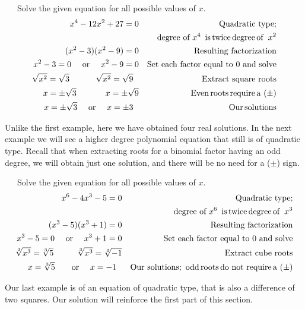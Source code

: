 \begin{example}~~~Solve the given equation for all possible values of $x$.
  \begin{eqnarray*}
   x^4-12x^2+27 = 0 &  & \operatorname{Quadratic~type;}\\
	& & ~~~\text{degree~of~} x^4 \operatorname{~is} \operatorname{twice} \operatorname{degree} \operatorname{of~} x^2\\
   (x^2-3)(x^2-9)=0 &  & \text{Resulting~factorization}  \\
	 x^2-3=0 \text{~~~~or~~~~} x^2-9=0 &  & \text{Set~each~factor~equal~to~}0 \text{~and~solve} \\
\sqrt{x^2} = \sqrt{3}~~~~~ \,\ \,\ \,\ \sqrt{x^2} = \sqrt{9}~~ &  & \operatorname{Extract~square~roots} \\
		x= \pm{\sqrt{3}}~~~~~~ \,\ \,\ \,\ x= \pm{\sqrt{9}} &  & \operatorname{Even} \operatorname{roots} \operatorname{require} \operatorname{a~} (\pm) \\
		x= \pm{\sqrt{3}}~~~~ \text{or~~~~}   x=\pm3~~ &  & \operatorname{Our} \operatorname{solutions}
	\end{eqnarray*}
\end{example}
Unlike the first example, here we have obtained four real solutions.  In the next example we will see a higher degree polynomial equation that still is of quadratic type.  Recall that when extracting roots for a binomial factor having an odd degree, we will obtain just one solution, and there will be no need for a ($\pm$) sign.

\begin{example}~~~Solve the given equation for all possible values of $x$.
  \begin{eqnarray*}
   x^6-4x^3-5 = 0 &  & \operatorname{Quadratic~type;}\\
	& & ~~~\text{degree~of~} x^6 \operatorname{~is} \operatorname{twice} \operatorname{degree} \operatorname{of~} x^3\\
   (x^3-5)(x^3+1)=0 &  & \text{Resulting~factorization}  \\
	 x^3-5=0 \text{~~~~or~~~~} x^3+1=0 &  & \text{Set~each~factor~equal~to~}0 \text{~and~solve} \\
\sqrt[3]{x^3} = \sqrt[3]{5}~~~~ \,\ \,\ \,\ \sqrt[3]{x^3} = \sqrt[3]{-1} &  & \operatorname{Extract~cube~roots} \\
		x= \sqrt[3]{5}~~~~~~ \text{or~~~~}   x=-1~~ &  & \operatorname{Our~solutions;~odd} \operatorname{roots} \operatorname{do~not~require} \operatorname{a~} (\pm)
	\end{eqnarray*}
\end{example}

Our last example is of an equation of quadratic type, that is also a difference of two squares.  Our solution will reinforce the first part of this section.

